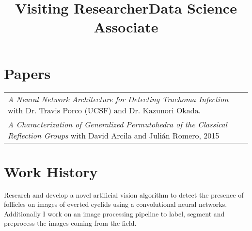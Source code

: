 \documentclass[margin,line,pifont,palatino,courier]{res}
\newenvironment{list1}{
  \begin{list}{\label{}}{
      \setlength{\itemsep}{0in}
      \setlength{\parsep}{0in} \setlength{\parskip}{0in}
      \setlength{\topsep}{0in} \setlength{\partopsep}{0in}
      \setlength{\leftmargin}{0.0in}}}{\end{list}}
\begin{document}
\begin{resume}
{{{{%







\section{\sc Papers}
\begin{tabular}{@{}p{5in}}
    {\em A Neural Network Architecture for Detecting Trachoma Infection} with Dr. Travis Porco (UCSF) and Dr. Kazunori Okada. \\

    {\em A Characterization of Generalized Permutohedra of the Classical Reflection Groups} with David Arcila and Juli\'an Romero, 2015
\end{tabular}









\section{\sc  Work History}

\title{Visiting Researcher}

\begin{position}
Research and develop a novel artificial vision algorithm to detect the presence of follicles on images of everted eyelids using a convolutional neural networks.  Additionally I work on an image processing pipeline to label, segment and preprocess the images coming from the field. 
\end{position}

 \title{Data Science Associate} 

}}}}
\end{resume}
\end{document}
